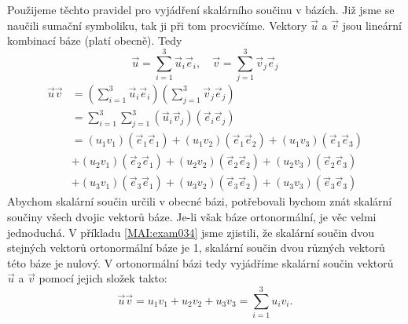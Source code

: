       Použijeme těchto pravidel pro vyjádření skalárního součinu v bázích. Již jsme se naučili
      sumační symboliku, tak ji při tom procvičíme. Vektory \(\vec{u}\) a \(\vec{v}\) jsou lineární
      kombinací báze (platí obecně). Tedy
      \begin{equation*}
        \vec{u} = \sum_{i=1}^3\vec{u}_i\vec{e}_i, \quad \vec{v} = \sum_{j=1}^3\vec{v}_j\vec{e}_j
      \end{equation*}
      \begin{align*}
        \vec{u}\vec{v}  
          &=\left(\sum_{i=1}^3\vec{u}_i\vec{e}_i\right)
            \left(\sum_{j=1}^3\vec{v}_j\vec{e}_j\right)                                           \\
          &=\sum_{i=1}^3\sum_{j=1}^3(\vec{u}_i\vec{v}_j)(\vec{e}_i\vec{e}_j)                      \\
          &=(u_1v_1)(\vec{e}_1\vec{e}_1)+(u_1v_2)(\vec{e}_1\vec{e}_2)+(u_1v_3)(\vec{e}_1\vec{e}_3)\\  
          &+(u_2v_1)(\vec{e}_2\vec{e}_1)+(u_2v_2)(\vec{e}_2\vec{e}_2)+(u_2v_3)(\vec{e}_2\vec{e}_3)\\
          &+(u_3v_1)(\vec{e}_3\vec{e}_1)+(u_3v_2)(\vec{e}_3\vec{e}_2)+(u_3v_3)(\vec{e}_3\vec{e}_3)
      \end{align*}
      Abychom skalární součin určili v obecné bázi, potřebovali bychom znát skalární součiny všech
      dvojic vektorů báze. Je-li však báze ortonormální, je věc velmi jednoduchá. V příkladu
      \ref{MAI:exam034} jsme zjistili, že skalární součin dvou stejných vektorů ortonormální báze je
      1, skalární součin dvou různých vektorů této báze je nulový. V ortonormální bázi tedy
      vyjádříme skalární součin vektorů \(\vec{u}\) a \(\vec{v}\) pomocí jejich složek takto:
      \begin{equation}\label{mai:eq097}
        \vec{u}\vec{v} = u_1v_1 + u_2v_2 + u_3v_3 = \sum_{i=1}^3u_iv_i.
      \end{equation}
      



